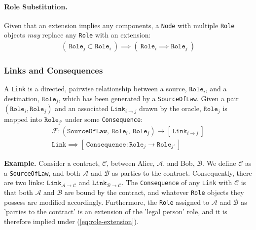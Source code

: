 \documentclass{article}
\numberwithin{equation}{section}
\newcommand{\quickexample}[1]{
\begin{tcolorbox}
	\textbf{Example.} #1
\end{tcolorbox}
}
\begin{document}

\paragraph{Role Substitution.} Given that an extension implies any components, a \texttt{Node} with multiple \texttt{Role} objects \textit{may} replace any \texttt{Role} with an extension:
\begin{align}
( \ \texttt{Role}_j \subset \texttt{Role}_i \ ) \implies ( \ \texttt{Role}_i \implies \texttt{Role}_j \ )
\end{align}


\subsubsection{Links and Consequences}\label{section:links-and-consequences}

A \texttt{Link} is a directed, pairwise relationship between a source, $\texttt{Role}_i$, and a destination, $\texttt{Role}_j$, which has been generated by a \texttt{SourceOfLaw}. Given a pair $(\texttt{Role}_i, \texttt{Role}_j)$ and an associated $\texttt{Link}_{i \rightarrow j}$ drawn by the oracle, $\texttt{Role}_j$ is mapped into $\texttt{Role}_{j'}$ under some \texttt{Consequence}:
\begin{align}\label{eq:role-extension}
	\mathcal{F} : (\texttt{SourceOfLaw}, \ \texttt{Role}_i, \ \texttt{Role}_j) \rightarrow [ \ \texttt{Link}_{i \rightarrow j} \ ] \\
	\texttt{Link} \implies [ \ \texttt{Consequence} : \texttt{Role}_j \rightarrow \texttt{Role}_{j'} \ ]
\end{align}

\vspace{0.25cm}
\quickexample{
	Consider a contract, $\mathcal{C}$, between Alice, $\mathcal{A}$, and Bob, $\mathcal{B}$. We define $\mathcal{C}$ as a \texttt{SourceOfLaw}, and both $\mathcal{A}$ and $\mathcal{B}$ as parties to the contract. Consequently, there are two links: $\texttt{Link}_{\mathcal{A} \rightarrow \mathcal{C}}$ and $\texttt{Link}_{\mathcal{B} \rightarrow \mathcal{C}}$. The \texttt{Consequence} of any \texttt{Link} with $\mathcal{C}$ is that both $\mathcal{A}$ and $\mathcal{B}$ are bound by the contract, and whatever \texttt{Role} objects they possess are modified accordingly. Furthermore, the \texttt{Role} assigned to $\mathcal{A}$ and $\mathcal{B}$ as 'parties to the contract' is an extension of the 'legal person' role, and it is therefore implied under (\ref{eq:role-extension}).
}
\end{document}

